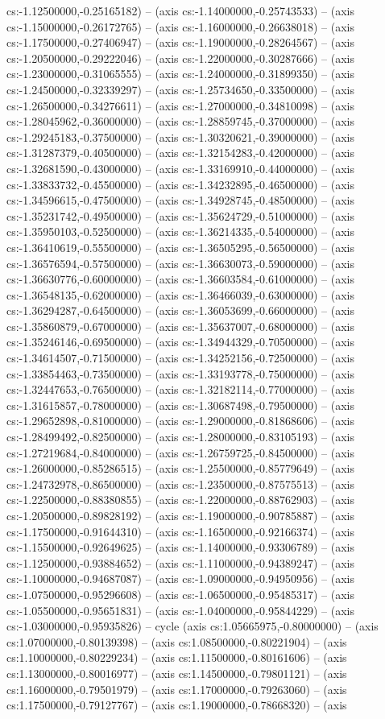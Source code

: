 cs:-1.12500000,-0.25165182) -- (axis cs:-1.14000000,-0.25743533) -- (axis cs:-1.15000000,-0.26172765) -- (axis cs:-1.16000000,-0.26638018) -- (axis cs:-1.17500000,-0.27406947) -- (axis cs:-1.19000000,-0.28264567) -- (axis cs:-1.20500000,-0.29222046) -- (axis cs:-1.22000000,-0.30287666) -- (axis cs:-1.23000000,-0.31065555) -- (axis cs:-1.24000000,-0.31899350) -- (axis cs:-1.24500000,-0.32339297) -- (axis cs:-1.25734650,-0.33500000) -- (axis cs:-1.26500000,-0.34276611) -- (axis cs:-1.27000000,-0.34810098) -- (axis cs:-1.28045962,-0.36000000) -- (axis cs:-1.28859745,-0.37000000) -- (axis cs:-1.29245183,-0.37500000) -- (axis cs:-1.30320621,-0.39000000) -- (axis cs:-1.31287379,-0.40500000) -- (axis cs:-1.32154283,-0.42000000) -- (axis cs:-1.32681590,-0.43000000) -- (axis cs:-1.33169910,-0.44000000) -- (axis cs:-1.33833732,-0.45500000) -- (axis cs:-1.34232895,-0.46500000) -- (axis cs:-1.34596615,-0.47500000) -- (axis cs:-1.34928745,-0.48500000) -- (axis cs:-1.35231742,-0.49500000) -- (axis cs:-1.35624729,-0.51000000) -- (axis cs:-1.35950103,-0.52500000) -- (axis cs:-1.36214335,-0.54000000) -- (axis cs:-1.36410619,-0.55500000) -- (axis cs:-1.36505295,-0.56500000) -- (axis cs:-1.36576594,-0.57500000) -- (axis cs:-1.36630073,-0.59000000) -- (axis cs:-1.36630776,-0.60000000) -- (axis cs:-1.36603584,-0.61000000) -- (axis cs:-1.36548135,-0.62000000) -- (axis cs:-1.36466039,-0.63000000) -- (axis cs:-1.36294287,-0.64500000) -- (axis cs:-1.36053699,-0.66000000) -- (axis cs:-1.35860879,-0.67000000) -- (axis cs:-1.35637007,-0.68000000) -- (axis cs:-1.35246146,-0.69500000) -- (axis cs:-1.34944329,-0.70500000) -- (axis cs:-1.34614507,-0.71500000) -- (axis cs:-1.34252156,-0.72500000) -- (axis cs:-1.33854463,-0.73500000) -- (axis cs:-1.33193778,-0.75000000) -- (axis cs:-1.32447653,-0.76500000) -- (axis cs:-1.32182114,-0.77000000) -- (axis cs:-1.31615857,-0.78000000) -- (axis cs:-1.30687498,-0.79500000) -- (axis cs:-1.29652898,-0.81000000) -- (axis cs:-1.29000000,-0.81868606) -- (axis cs:-1.28499492,-0.82500000) -- (axis cs:-1.28000000,-0.83105193) -- (axis cs:-1.27219684,-0.84000000) -- (axis cs:-1.26759725,-0.84500000) -- (axis cs:-1.26000000,-0.85286515) -- (axis cs:-1.25500000,-0.85779649) -- (axis cs:-1.24732978,-0.86500000) -- (axis cs:-1.23500000,-0.87575513) -- (axis cs:-1.22500000,-0.88380855) -- (axis cs:-1.22000000,-0.88762903) -- (axis cs:-1.20500000,-0.89828192) -- (axis cs:-1.19000000,-0.90785887) -- (axis cs:-1.17500000,-0.91644310) -- (axis cs:-1.16500000,-0.92166374) -- (axis cs:-1.15500000,-0.92649625) -- (axis cs:-1.14000000,-0.93306789) -- (axis cs:-1.12500000,-0.93884652) -- (axis cs:-1.11000000,-0.94389247) -- (axis cs:-1.10000000,-0.94687087) -- (axis cs:-1.09000000,-0.94950956) -- (axis cs:-1.07500000,-0.95296608) -- (axis cs:-1.06500000,-0.95485317) -- (axis cs:-1.05500000,-0.95651831) -- (axis cs:-1.04000000,-0.95844229) -- (axis cs:-1.03000000,-0.95935826) -- cycle (axis cs:1.05665975,-0.80000000) -- (axis cs:1.07000000,-0.80139398) -- (axis cs:1.08500000,-0.80221904) -- (axis cs:1.10000000,-0.80229234) -- (axis cs:1.11500000,-0.80161606) -- (axis cs:1.13000000,-0.80016977) -- (axis cs:1.14500000,-0.79801121) -- (axis cs:1.16000000,-0.79501979) -- (axis cs:1.17000000,-0.79263060) -- (axis cs:1.17500000,-0.79127767) -- (axis cs:1.19000000,-0.78668320) -- (axis 
